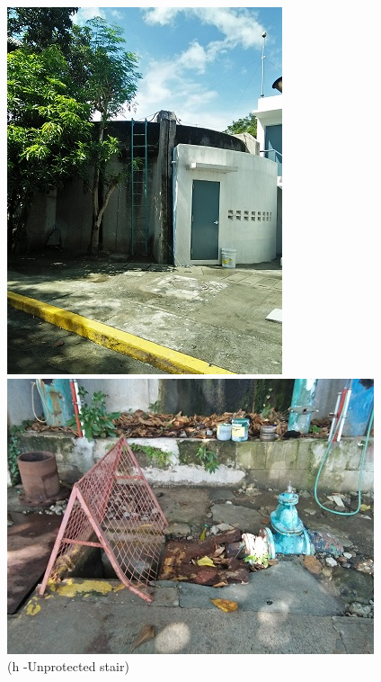 \begin{figure}
\begin{minipage}[b]{0.22\linewidth}
	\includegraphics[width=\textwidth]{figures/R1P_safety/unprotected_stair_reservoir.jpg}
	\caption*{(h -Unprotected stair)}
\end{minipage}
	\hspace{0.05cm}
\begin{minipage}[b]{0.22\linewidth}
	\centering
	\includegraphics[width=\textwidth]{figures/R1P_safety/manhole_no_signal.jpg}

\end{minipage}
\end{figure}
